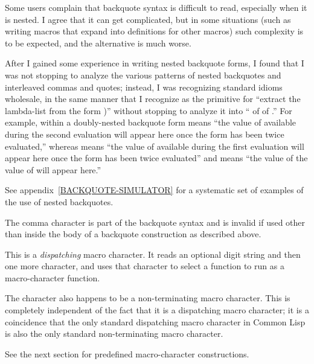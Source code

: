 \begin{flushdesc}

\begin{new}
Some users complain that backquote syntax is difficult to read,
especially when it is nested.  I agree that it can get complicated,
but in some situations (such as writing macros that expand into
definitions for other macros) such complexity is to be expected,
and the alternative is much worse.

After I gained some experience in writing nested backquote forms,
I found that I was not stopping to analyze the various patterns
of nested backquotes and interleaved commas and quotes; instead, I was
recognizing standard idioms wholesale, in the same manner that I recognize 
as the primitive for ``extract the lambda-list from the
form )'' without stopping to analyze it into
`` of  of .''  For example,  within
a doubly-nested backquote form means ``the value of  available
during the second evaluation
will appear here once the form has been twice
evaluated,'' whereas  means ``the value of  available during the
first evaluation will appear here once the form has been twice
evaluated'' and  means ``the value of the value of  will appear here.''

See appendix~\ref{BACKQUOTE-SIMULATOR} for a systematic set of examples
of the use of nested backquotes.
\end{new}

\item[\cd{,}]
The comma character is part of the backquote syntax
and is invalid if used other than inside the body of a backquote
construction as described above.

\item[\cd{\#}]
This is a \emph{dispatching} macro character.
It reads an optional digit string and then one more character,
and uses that character to select a function to run as a macro-character
function.

The \cd{\#} character also happens to be a non-terminating
macro character.  This is completely independent of the fact that
it is a dispatching macro character; it is a coincidence that
the only standard dispatching macro character in Common Lisp is
also the only standard non-terminating macro character.

See the next section for predefined \cd{\#} macro-character constructions.
\end{flushdesc}

